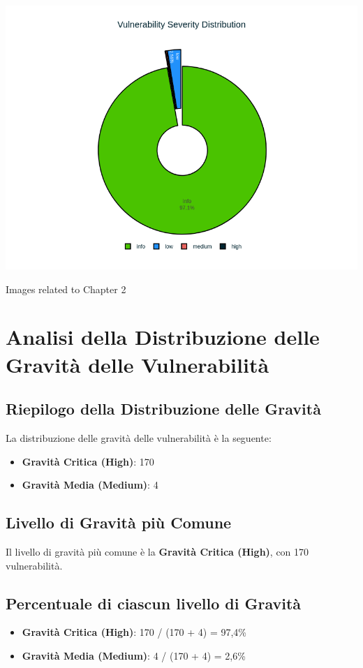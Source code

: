 \begin{center}
\includegraphics[width=\linewidth]{pngs/1_1.png}
\vspace{1cm}\caption{Images related to Chapter 2}
\end{center}
\chapter{Analisi della Distribuzione delle Gravità delle Vulnerabilità}

\section{Riepilogo della Distribuzione delle Gravità}

La distribuzione delle gravità delle vulnerabilità è la seguente:
\begin{itemize}
\item \textbf{Gravità Critica (High)}: 170
\item \textbf{Gravità Media (Medium)}: 4
\end{itemize}
\section{Livello di Gravità più Comune}

Il livello di gravità più comune è la \textbf{Gravità Critica (High)}, con 170 vulnerabilità.

\section{Percentuale di ciascun livello di Gravità}
\begin{itemize}
\item \textbf{Gravità Critica (High)}: 170 / (170 + 4) = 97,4\%
\item \textbf{Gravità Media (Medium)}: 4 / (170 + 4) = 2,6\%
\end{itemize}
